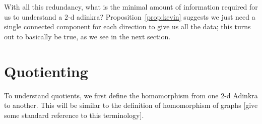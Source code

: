 \documentclass[12pt,twoside,singlespace]{article}
\numberwithin{equation}{section}
\newtheorem{lem}[equation]{Lemma}
\theoremstyle{definition}
\newcommand{\ZZ}{\mathbf{Z}}
\begin{document}

With all this redundancy, what is the minimal amount of information required for us to understand a $2$-d adinkra? Proposition~\ref{prop:kevin} suggests we just need a single connected component for each direction to give us all the data; this turns out to basically be true, as we see in the next section.

\begin{comment}
\begin{lem}
\label{lem:square}
In a $2$-d adinkra, suppose we have a path $(x, y \pm_1 1) \rightarrow (x, y) \rightarrow (x \pm_2 1, y)$, where each $\pm_i$ corresponds to a choice of sign, the first and the last vertices are connected to $(x \pm_2 1, y \pm_1 1)$ via the corresponding colors in a square.
\end{lem}
\begin{proof}
Because we have an ($1$-d) adinkra, the two edges in this path correspond to two different colors (WLOG $1$ and $2$ in order) respectively, and if we use the colors $2$ and $1$ in order we must also reach $(x \pm_2 1, y)$ from $(x, y \pm_1 1)$. Because left-moving colors only correspond to $y$-axis moves in the $\ZZ^2$ bigrading, and right-moving colors only correspond to $x$-axis moves, the first move must have displacement $(\pm_2 1, 0)$ and the second move must have displacement $(0, \pm_1)$. This is exactly equivalent to the statement.
\end{proof}
\end{comment}

\begin{comment}



We will worry less about exact rankings right now with the following construction: 

\end{comment}


\section{Quotienting}
To understand quotients, we first define the homomorphism from one $2$-d Adinkra to another.  This will be similar to the definition of homomorphism of graphs [give some standard reference to this terminology].
\end{document}
